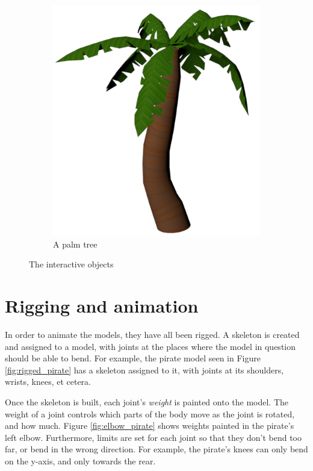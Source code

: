 \begin{figure}[h!]
\begin{subfigure}[b]{0.3\textwidth}
    \end{subfigure}
    \begin{subfigure}[b]{0.3\textwidth}
    	\centering
        \includegraphics[scale=0.2]{figures/PalmTree.png}\caption{A palm tree\label{fig:palmtree}}
    \end{subfigure}
\caption{The interactive objects}\label{fig:objects}
\end{figure}

\pagebreak
\section{Rigging and animation}
In order to animate the models, they have all been rigged. A skeleton is created and assigned to a model, with joints at the places where the model in question should be able to bend. For example, the pirate model seen in Figure \ref{fig:rigged_pirate} has a skeleton assigned to it, with joints at its shoulders, wrists, knees, et cetera.

Once the skeleton is built, each joint's \textit{weight} is painted onto the model. The weight of a joint controls which parts of the body move as the joint is rotated, and how much. Figure \ref{fig:elbow_pirate} shows weights painted in the pirate's left elbow. Furthermore, limits are set for each joint so that they don't bend too far, or bend in the wrong direction. For example, the pirate's knees can only bend on the y-axis, and only towards the rear.

